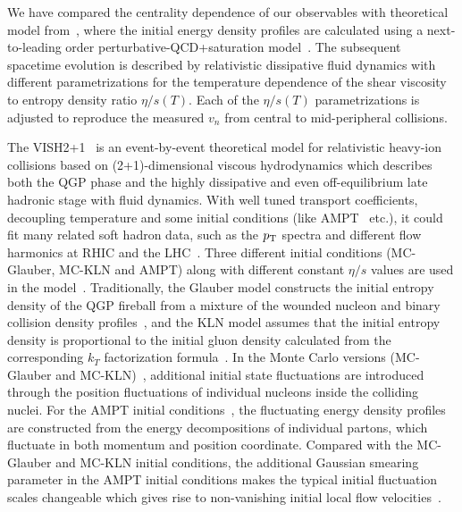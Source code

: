 We have compared the centrality dependence of our observables with theoretical model from~\cite{Niemi:2015qia}, where the initial energy density profiles are calculated using a next-to-leading order perturbative-QCD+saturation model~\cite{Paatelainen:2012at,Paatelainen:2013eea}. The subsequent spacetime evolution is described by relativistic dissipative fluid dynamics with different parametrizations for the temperature dependence of the shear viscosity to entropy density ratio $\eta/s(T)$. Each of the $\eta/s(T)$ parametrizations is adjusted to reproduce the measured $v_n$ from central to mid-peripheral collisions. 

The VISH2+1~\cite{Shen:2010uy,Shen:2014vra} is an event-by-event theoretical model for relativistic heavy-ion collisions based on (2+1)-dimensional viscous hydrodynamics which describes both the QGP phase and the highly dissipative and even off-equilibrium late hadronic stage with fluid dynamics. With well tuned transport coefficients, decoupling temperature  and some initial conditions (like {AMPT}~\cite{Xu:2016hmp,Bhalerao:2015iya,Pang:2012he} etc.), it could fit many related soft hadron data, such as the $p_{\rm T}$ spectra and different flow harmonics at RHIC and the LHC~\cite{Qiu:2011hf, Shen:2010uy, Shen:2011eg, Bhalerao:2015iya}.
Three different initial conditions ({MC-Glauber}, {MC-KLN} and {AMPT}) along with different constant $\eta/s$ values are used in the model~\cite{Zhu:2016puf}. 
Traditionally, the Glauber model constructs the initial entropy density of the QGP fireball from a mixture of the wounded nucleon and binary collision density profiles~\cite{Kolb:2000sd}, and the {KLN} model assumes that the initial entropy density is proportional to the initial gluon density calculated from the corresponding $k_T$ factorization formula~\cite{Kharzeev:2000ph}. In the Monte Carlo versions ({MC-Glauber} and {MC-KLN})~\cite{Miller:2007ri,Drescher:2006ca,Hirano:2009ah}, additional initial state fluctuations are introduced through the position fluctuations of individual nucleons inside the colliding nuclei. For the {AMPT} initial conditions~\cite{Bhalerao:2015iya,Pang:2012he,Xu:2016hmp}, the fluctuating energy density profiles are constructed from the energy decompositions of individual partons, which fluctuate in both momentum and position coordinate. Compared with the {MC-Glauber} and {MC-KLN} initial conditions, the additional Gaussian smearing parameter in the {AMPT} initial conditions makes the typical initial fluctuation scales changeable which gives rise to non-vanishing initial local flow velocities~\cite{Pang:2012he}.
